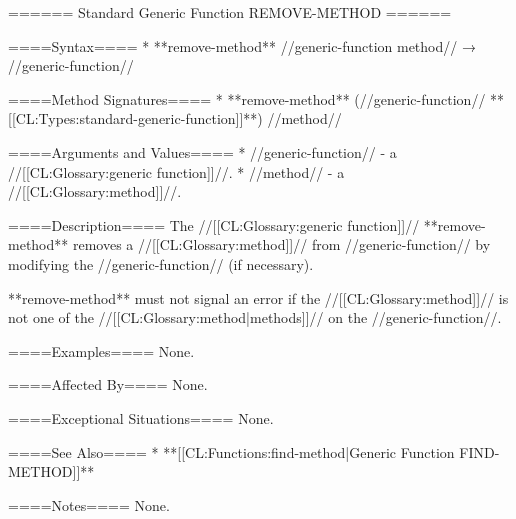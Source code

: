 ====== Standard Generic Function REMOVE-METHOD ======

====Syntax====
  * **remove-method** //generic-function method// → //generic-function//

====Method Signatures====
  * **remove-method** (//generic-function// **[[CL:Types:standard-generic-function]]**) //method//

====Arguments and Values====
  * //generic-function// - a //[[CL:Glossary:generic function]]//.
  * //method// - a //[[CL:Glossary:method]]//.

====Description====
The //[[CL:Glossary:generic function]]// **remove-method** removes a //[[CL:Glossary:method]]// from //generic-function// by modifying the //generic-function// (if necessary).

**remove-method** must not signal an error if the //[[CL:Glossary:method]]// is not one of the //[[CL:Glossary:method|methods]]// on the //generic-function//.

====Examples====
None.

====Affected By====
None.

====Exceptional Situations====
None.

====See Also====
  * **[[CL:Functions:find-method|Generic Function FIND-METHOD]]**

====Notes====
None.

